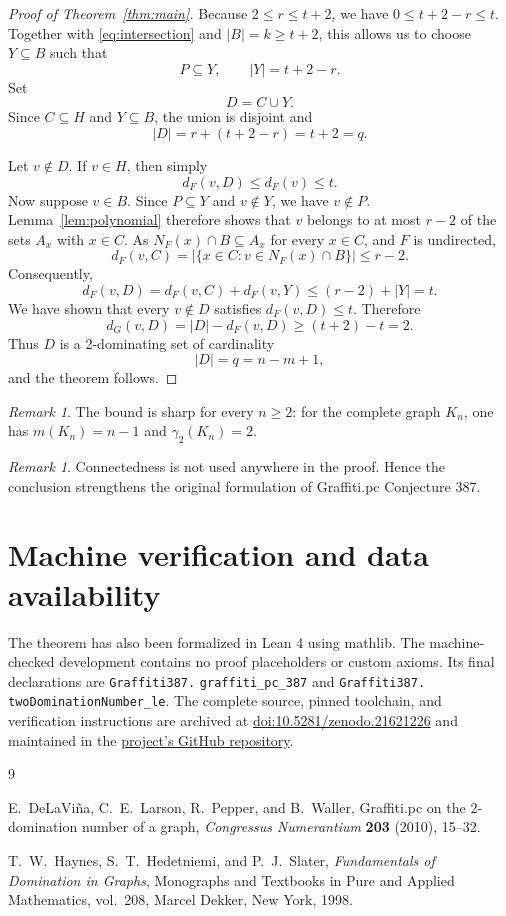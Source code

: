\documentclass[11pt]{article}
\theoremstyle{remark}
\newtheorem{remark}[theorem]{Remark}
\newcommand{\gammatwo}{\gamma_{2}}
\begin{document}
\begin{proof}[Proof of Theorem~\ref{thm:main}]
Because $2\leq r\leq t+2$, we have $0\leq t+2-r\leq t$.  Together with
\eqref{eq:intersection} and $|B|=k\geq t+2$, this allows us to choose
$Y\subseteq B$ such that
\[
  P\subseteq Y,
  \qquad |Y|=t+2-r.
\]
Set
\[
  D=C\cup Y.
\]
Since $C\subseteq H$ and $Y\subseteq B$, the union is disjoint and
\[
  |D|=r+(t+2-r)=t+2=q.
\]

Let $v\notin D$.  If $v\in H$, then simply
\[
  d_F(v,D)\leq d_F(v)\leq t.
\]
Now suppose $v\in B$.  Since $P\subseteq Y$ and $v\notin Y$, we have
$v\notin P$.  Lemma~\ref{lem:polynomial} therefore shows that $v$ belongs to
at most $r-2$ of the sets $A_x$ with $x\in C$.  As
$N_F(x)\cap B\subseteq A_x$ for every $x\in C$, and $F$ is undirected,
\[
  d_F(v,C)
  =|\{x\in C:v\in N_F(x)\cap B\}|
  \leq r-2.
\]
Consequently,
\[
  d_F(v,D)=d_F(v,C)+d_F(v,Y)
  \leq (r-2)+|Y|=t.
\]
We have shown that every $v\notin D$ satisfies $d_F(v,D)\leq t$.  Therefore
\[
  d_G(v,D)=|D|-d_F(v,D)\geq(t+2)-t=2.
\]
Thus $D$ is a 2-dominating set of cardinality
\[
  |D|=q=n-m+1,
\]
and the theorem follows.
\end{proof}

\begin{remark}
The bound is sharp for every $n\geq 2$: for the complete graph $K_n$, one has
$m(K_n)=n-1$ and $\gammatwo(K_n)=2$.
\end{remark}

\begin{remark}
Connectedness is not used anywhere in the proof.  Hence the conclusion
strengthens the original formulation of Graffiti.pc Conjecture 387.
\end{remark}

\section*{Machine verification and data availability}

The theorem has also been formalized in Lean 4 using mathlib.  The
machine-checked development contains no proof placeholders or custom axioms.
Its final declarations are \texttt{Graffiti387.}\allowbreak
\texttt{graffiti\_pc\_387} and \texttt{Graffiti387.}\allowbreak
\texttt{twoDominationNumber\_le}.  The complete source, pinned
toolchain, and verification instructions are archived at
\href{https://doi.org/10.5281/zenodo.21621226}
{doi:10.5281/zenodo.21621226} and maintained in the
\href{https://github.com/qscqesze/graffiti-pc-conjecture-387}
{project's GitHub repository}.

\begin{thebibliography}{9}

E.~DeLaVi{\~n}a, C.~E.~Larson, R.~Pepper, and B.~Waller,
\newblock Graffiti.pc on the 2-domination number of a graph,
\newblock \emph{Congressus Numerantium} \textbf{203} (2010), 15--32.

T.~W.~Haynes, S.~T.~Hedetniemi, and P.~J.~Slater,
\newblock \emph{Fundamentals of Domination in Graphs},
\newblock Monographs and Textbooks in Pure and Applied Mathematics, vol.~208,
Marcel Dekker, New York, 1998.

\end{thebibliography}
\end{document}
